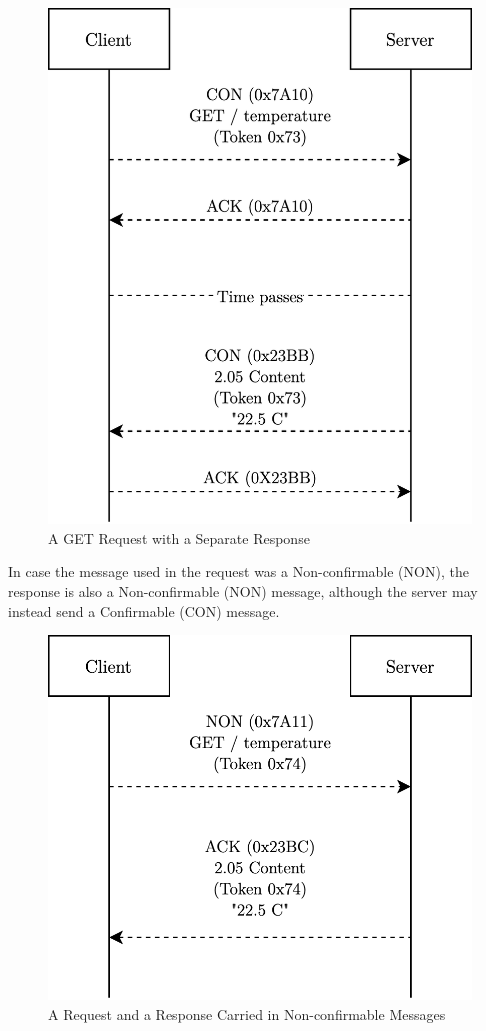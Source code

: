 \documentclass[11pt]{book}
\begin{document}
\begin{itemize}
\begin{figure}[H]
	\includegraphics [scale=0.175] {separatereqres.png}
	\caption{A GET Request with a Separate Response}
\end{figure}
\end{itemize}
In case the message used in the request was a Non-confirmable (NON), the response is also a Non-confirmable (NON) message, although the server may instead send a Confirmable (CON) message.
\begin{figure}[H]
	\centering
	\includegraphics [scale=0.175] {nonreqres.png}
	\caption{A Request and a Response Carried in Non-confirmable Messages}
\end{figure}
\end{document}
